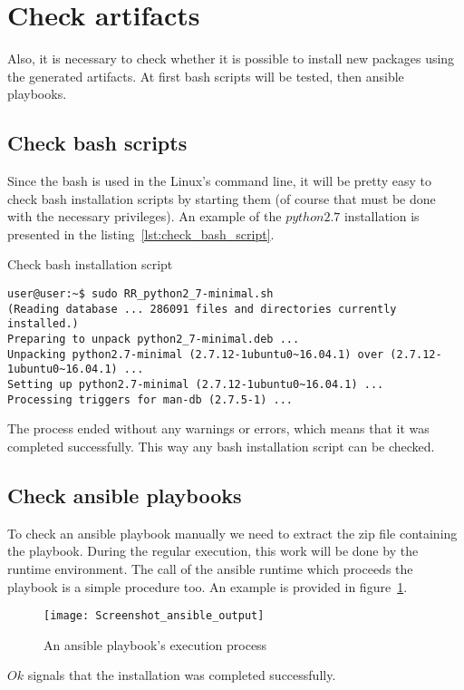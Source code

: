 \section{Check artifacts}\label{sec:checkart}
Also, it is necessary to check whether it is possible to install new packages using the generated artifacts.
At first bash scripts will be tested, then ansible playbooks.
\subsection*{Check bash scripts}
Since the bash is used in the Linux's command line, it will be pretty easy to check bash installation scripts by starting them (of course that must be done with the necessary privileges).
An example of the $python2.7$ installation is presented in the listing~\ref{lst:check_bash_script}.\\
\begin{Listing}
\caption{Check bash installation script}
\label{lst:check_bash_script}
\begin{lstlisting}
user@user:~$ sudo RR_python2_7-minimal.sh 
(Reading database ... 286091 files and directories currently installed.)
Preparing to unpack python2_7-minimal.deb ...
Unpacking python2.7-minimal (2.7.12-1ubuntu0~16.04.1) over (2.7.12-1ubuntu0~16.04.1) ...
Setting up python2.7-minimal (2.7.12-1ubuntu0~16.04.1) ...
Processing triggers for man-db (2.7.5-1) ...
\end{lstlisting}
\end{Listing}
The process ended without any warnings or errors, which means that it was completed successfully.
This way any bash installation script can be checked.

\subsection*{Check ansible playbooks}
To check an ansible playbook manually we need to extract the zip file containing the playbook. 
During the regular execution, this work will be done by the runtime environment.
The call of the ansible runtime which proceeds the playbook is a simple procedure too.
An example is provided in figure~\ref{fig:ansible_output2}.\\
 \begin{figure}[ht]   
	\centering
	\texttt{[image: Screenshot\_ansible\_output]}
	\caption{An ansible playbook's execution process}
	\label{fig:ansible_output2}
\end{figure}
$Ok$ signals that the installation was completed successfully.